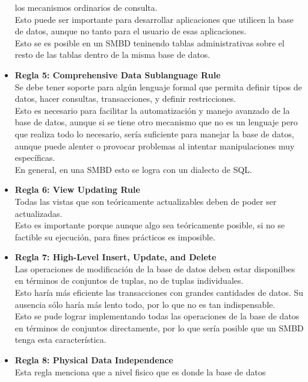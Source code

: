 \documentclass{article}
\begin{document}
\begin{itemize}
        los mecanismos ordinarios de consulta.\\
        Esto puede ser importante para desarrollar aplicaciones que utilicen la 
        base de datos, aunque no tanto para el usuario de esas aplicaciones.\\
        Esto se es posible en un SMBD teninendo tablas administrativas sobre 
        el resto de las tablas dentro de la misma base de datos.
    	\item\textbf{Regla 5: Comprehensive Data Sublanguage Rule}\\
        Se debe tener soporte para algún lenguaje formal que permita definir tipos
        de datos, hacer consultas, transacciones, y definir restricciones.\\
        Esto es necesario para facilitar la automatización y manejo avanzado de
        la base de datos, aunque si se tiene otro mecanismo que no es un lenguaje
        pero que realiza todo lo necesario, sería suficiente para manejar la base
        de datos, aunque puede alenter o provocar problemas al intentar 
        manipulaciones muy específicas.\\
        En general, en una SMBD esto se logra con un dialecto de SQL.
    	\item\textbf{Regla 6: View Updating Rule}\\
        Todas las vistas que son teóricamente actualizables deben de poder ser 
        actualizadas.\\
        Esto es importante porque aunque algo sea teóricamente posible, si no se 
        factible su ejecución, para fines prácticos es imposible.
    	\item\textbf{Regla 7: High-Level Insert, Update, and Delete}\\
        Las operaciones de modificación de la base de datos deben estar 
        disponilbes en términos de conjuntos de tuplas, no de tuplas
        individuales.\\
        Esto haría más eficiente las transacciones con grandes cantidades de 
        datos. Su ausencia sólo haría más lento todo, por lo que no es tan
        indispensable.\\
        Esto se pude lograr implementando todas las operaciones de la base de
        datos en términos de conjuntos directamente, por lo que sería posible
        que un SMBD tenga esta característica.
    	\item\textbf{Regla 8: Physical Data Independence}\\
        Esta regla menciona que a nivel fisico que es donde la base de datos 

\end{itemize}
\end{document}
